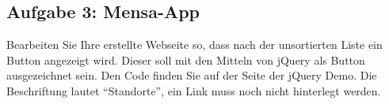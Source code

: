 \subsection{Aufgabe 3: Mensa-App}
Bearbeiten Sie Ihre erstellte Webseite so, dass nach der unsortierten Liste ein Button angezeigt wird.
Dieser soll mit den Mitteln von jQuery als Button ausgezeichnet sein.
Den Code finden Sie auf der Seite der jQuery Demo.
Die Beschriftung lautet "`Standorte"', ein Link muss noch nicht hinterlegt werden.















































